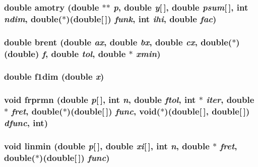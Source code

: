\subsubsection{\setlength{\rightskip}{0pt plus 5cm}double amotry (double $\ast$$\ast$ {\em p}, double {\em y}[$\,$], double {\em psum}[$\,$], int {\em ndim}, double($\ast$)(double[$\,$]) {\em funk}, int {\em ihi}, double {\em fac})}\label{minimize_8h_f5b85260cf99fa6442fdf0a9f4eb6d46}


\subsubsection{\setlength{\rightskip}{0pt plus 5cm}double brent (double {\em ax}, double {\em bx}, double {\em cx}, double($\ast$)(double) {\em f}, double {\em tol}, double $\ast$ {\em xmin})}\label{minimize_8h_4fd8796511d2de86aee49722d758b5b6}


\subsubsection{\setlength{\rightskip}{0pt plus 5cm}double f1dim (double {\em x})}\label{minimize_8h_1f33ec0c582389ac212cdd33637c4291}


\subsubsection{\setlength{\rightskip}{0pt plus 5cm}void frprmn (double {\em p}[$\,$], int {\em n}, double {\em ftol}, int $\ast$ {\em iter}, double $\ast$ {\em fret}, double($\ast$)(double[$\,$]) {\em func}, void($\ast$)(double[$\,$], double[$\,$]) {\em dfunc}, int)}\label{minimize_8h_2ad4d8b4ec06eda761c87b6c12c70302}


\subsubsection{\setlength{\rightskip}{0pt plus 5cm}void linmin (double {\em p}[$\,$], double {\em xi}[$\,$], int {\em n}, double $\ast$ {\em fret}, double($\ast$)(double[$\,$]) {\em func})}\label{minimize_8h_fa23520c3f1daeead3c49076a30bb3a9}


